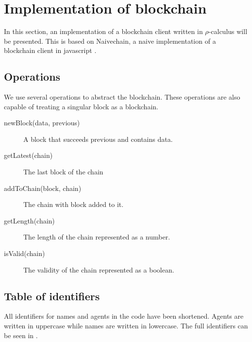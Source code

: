\section{Implementation of blockchain}
In this section, an implementation of a blockchain client written in $\rho$-calculus will be presented.
This is based on Naivechain, a naive implementation of a blockchain client in javascript \cite{naivechain}.


\subsection{Operations}

We use several operations to abstract the blockchain. These operations are also capable of treating a singular block as a blockchain.

\begin{description}
	\item[newBlock(data, previous)]
	A block that succeeds previous and contains data.
	\item[getLatest(chain)]
	The last block of the chain
	\item[addToChain(block, chain)]
	The chain with block added to it.
	\item[getLength(chain)]
	The length of the chain represented as a number.
	\item[isValid(chain)]
	The validity of the chain represented as a boolean.
\end{description}

\subsection{Table of identifiers}

All identifiers for names and agents in the code have been shortened. Agents are written in uppercase while names are written in lowercase. The full identifiers can be seen in .

